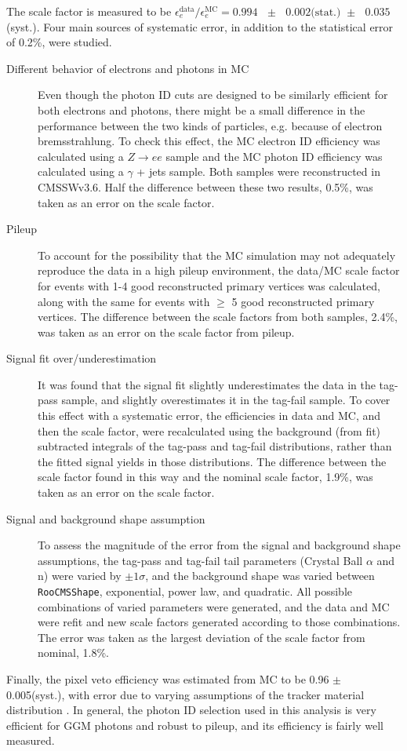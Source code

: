 \documentclass[dissertation.tex]{subfiles}
\begin{document}
The scale factor is measured to be $\epsilon_{e}^{\mathrm{data}}/\epsilon_{e}^{\mathrm{MC}} = 0.994\mbox{ }\pm\mbox{ }0.002\mbox{(stat.) }\pm\mbox{ }0.035$(syst.).  Four main sources of systematic error, in addition to the statistical error of 0.2\%, were studied.

\begin{description}
  \item[Different behavior of electrons and photons in MC] Even though the photon ID cuts are designed to be similarly efficient for both electrons and photons, there might be a small difference in the performance between the two kinds of particles, e.g. because of electron bremsstrahlung.  To check this effect, the MC electron ID efficiency was calculated using a $Z\rightarrow ee$ sample and the MC photon ID efficiency was calculated using a $\gamma$ + jets sample.  Both samples were reconstructed in CMSSWv3.6.  Half the difference between these two results, 0.5\%, was taken as an error on the scale factor.
  \item[Pileup] To account for the possibility that the MC simulation may not adequately reproduce the data in a high pileup environment, the data/MC scale factor for events with 1-4 good reconstructed primary vertices was calculated, along with the same for events with $\geq$ 5 good reconstructed primary vertices.  The difference between the scale factors from both samples, 2.4\%, was taken as an error on the scale factor from pileup.
  \item[Signal fit over/underestimation] It was found that the signal fit slightly underestimates the data in the tag-pass sample, and slightly overestimates it in the tag-fail sample.  To cover this effect with a systematic error, the efficiencies in data and MC, and then the scale factor, were recalculated using the background (from fit) subtracted integrals of the tag-pass and tag-fail distributions, rather than the fitted signal yields in those distributions.  The difference between the scale factor found in this way and the nominal scale factor, 1.9\%, was taken as an error on the scale factor.
  \item[Signal and background shape assumption] To assess the magnitude of the error from the signal and background shape assumptions, the tag-pass and tag-fail tail parameters (Crystal Ball $\alpha$ and n) were varied by $\pm1\sigma$, and the background shape was varied between \verb+RooCMSShape+, exponential, power law, and quadratic.  All possible combinations of varied parameters were generated, and the data and MC were refit and new scale factors generated according to those combinations.  The error was taken as the largest deviation of the scale factor from nominal, 1.8\%.
\end{description}

Finally, the pixel veto efficiency was estimated from MC to be 0.96 $\pm$ 0.005(syst.), with error due to varying assumptions of the tracker material distribution \cite{CMS_AN-2010/271}.  In general, the photon ID selection used in this analysis is very efficient for GGM photons and robust to pileup, and its efficiency is fairly well measured.
\end{document}
